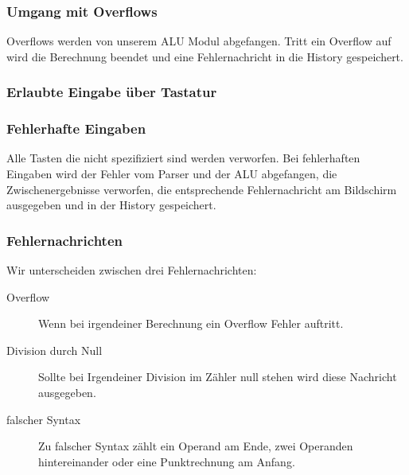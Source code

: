 \subsubsection{Umgang mit Overflows}
Overflows werden von unserem ALU Modul abgefangen. Tritt ein Overflow auf wird die Berechnung beendet und eine Fehlernachricht in die History gespeichert.
\subsubsection{Erlaubte Eingabe über Tastatur}

\subsubsection{Fehlerhafte Eingaben}
Alle Tasten die nicht spezifiziert sind werden verworfen. Bei fehlerhaften Eingaben wird der Fehler vom Parser und der ALU abgefangen, die Zwischenergebnisse verworfen, die entsprechende Fehlernachricht am Bildschirm ausgegeben und in der History gespeichert.
\subsubsection{Fehlernachrichten}
Wir unterscheiden zwischen drei Fehlernachrichten:
\begin{description}
 \item[Overflow] Wenn bei irgendeiner Berechnung ein Overflow Fehler auftritt. 
 \item[Division durch Null] Sollte bei Irgendeiner Division im Zähler null stehen wird diese Nachricht ausgegeben.
 \item[falscher Syntax]Zu falscher Syntax zählt ein Operand am Ende, zwei Operanden hintereinander oder eine Punktrechnung am Anfang.
\end{description}


